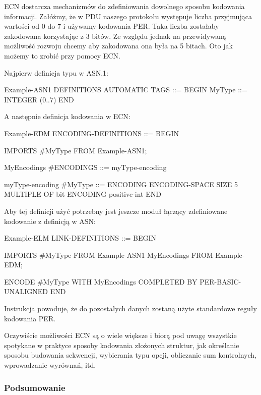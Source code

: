 \documentclass[00-praca-magisterska.tex]{subfiles}
\begin{document}
ECN dostarcza mechanizmów do zdefiniowania dowolnego sposobu kodowania
informacji. Załóżmy, że w PDU naszego protokołu występuje liczba przyjmująca
wartości od 0 do 7 i używamy kodowania PER. Taka liczba zostałaby zakodowana
korzystając z 3 bitów. Ze względu jednak na przewidywaną możliwość rozwoju
chcemy aby zakodowana ona była na 5 bitach. Oto jak możemy to zrobić przy
pomocy ECN.

Najpierw definicja typu w ASN.1:

\begin{textcode}
  Example-ASN1 DEFINITIONS AUTOMATIC TAGS ::=
  BEGIN
    MyType ::= INTEGER (0..7)
  END
\end{textcode}

A następnie definicja kodowania w ECN:

\begin{textcode}
  Example-EDM ENCODING-DEFINITIONS ::=
  BEGIN
  
  IMPORTS
    #MyType
  FROM Example-ASN1;
  
  MyEncodings #ENCODINGS ::= { myType-encoding }
  
  myType-encoding #MyType ::= {
    ENCODING {
      ENCODING-SPACE
      SIZE 5
      MULTIPLE OF bit
      ENCODING positive-int
    }
  }
  END
\end{textcode}

Aby tej definicji użyć potrzebny jest jeszcze moduł łączący zdefiniowane kodowanie z definicją w ASN:

\begin{textcode}
  Example-ELM LINK-DEFINITIONS ::=
  BEGIN
  
  IMPORTS
    #MyType
  FROM Example-ASN1
    MyEncodings
  FROM Example-EDM;
  
  ENCODE #MyType
    WITH          MyEncodings
    COMPLETED BY  PER-BASIC-UNALIGNED
  END
\end{textcode}

Instrukcja  powoduje, że do pozostałych danych zostaną użyte
standardowe reguły kodowania PER.

Oczywiście możliwości ECN są o wiele większe i biorą pod uwagę wszystkie
spotykane w praktyce sposoby kodowania złożonych struktur, jak określanie
sposobu budowania sekwencji, wybierania typu opcji, obliczanie sum kontrolnych,
wprowadzanie wyrównań, itd.

\subsubsection{Podsumowanie}
\end{document}
